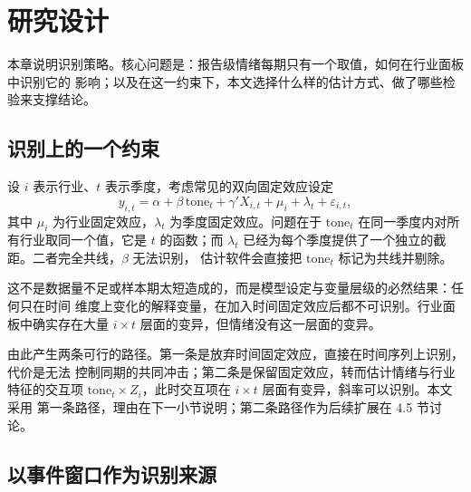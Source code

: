
\section{研究设计}

本章说明识别策略。核心问题是：报告级情绪每期只有一个取值，如何在行业面板中识别它的
影响；以及在这一约束下，本文选择什么样的估计方式、做了哪些检验来支撑结论。

\subsection{识别上的一个约束}

设 $i$ 表示行业、$t$ 表示季度，考虑常见的双向固定效应设定
\begin{equation}
y_{i,t}=\alpha+\beta\,\text{tone}_t+\gamma'X_{i,t}+\mu_i+\lambda_t+\varepsilon_{i,t},
\label{eq:twoway}
\end{equation}
其中 $\mu_i$ 为行业固定效应，$\lambda_t$ 为季度固定效应。问题在于
$\text{tone}_t$ 在同一季度内对所有行业取同一个值，它是 $t$ 的函数；而
$\lambda_t$ 已经为每个季度提供了一个独立的截距。二者完全共线，$\beta$ 无法识别，
估计软件会直接把 $\text{tone}_t$ 标记为共线并剔除。

这不是数据量不足或样本期太短造成的，而是模型设定与变量层级的必然结果：任何只在时间
维度上变化的解释变量，在加入时间固定效应后都不可识别。行业面板中确实存在大量
$i\times t$ 层面的变异，但情绪没有这一层面的变异。

由此产生两条可行的路径。第一条是放弃时间固定效应，直接在时间序列上识别，代价是无法
控制同期的共同冲击；第二条是保留固定效应，转而估计情绪与行业特征的交互项
$\text{tone}_t\times Z_i$，此时交互项在 $i\times t$ 层面有变异，斜率可以识别。本文采用
第一条路径，理由在下一小节说明；第二条路径作为后续扩展在 4.5 节讨论。

\subsection{以事件窗口作为识别来源}

